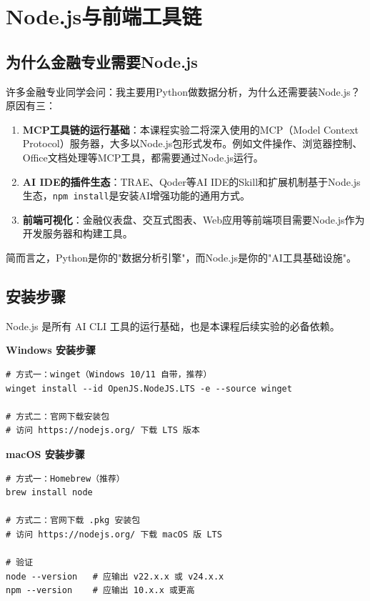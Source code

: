 \section{Node.js与前端工具链}

\subsection{为什么金融专业需要Node.js}

许多金融专业同学会问：我主要用Python做数据分析，为什么还需要装Node.js？原因有三：

\begin{enumerate}[leftmargin=2em]
  \item \textbf{MCP工具链的运行基础}：本课程实验二将深入使用的MCP（Model Context Protocol）服务器，大多以Node.js包形式发布。例如文件操作、浏览器控制、Office文档处理等MCP工具，都需要通过Node.js运行。
  \item \textbf{AI IDE的插件生态}：TRAE、Qoder等AI IDE的Skill和扩展机制基于Node.js生态，\texttt{npm install}是安装AI增强功能的通用方式。
  \item \textbf{前端可视化}：金融仪表盘、交互式图表、Web应用等前端项目需要Node.js作为开发服务器和构建工具。
\end{enumerate}

简而言之，Python是你的"数据分析引擎"，而Node.js是你的"AI工具基础设施"。

\subsection{安装步骤}

Node.js 是所有 AI CLI 工具的运行基础，也是本课程后续实验的必备依赖。

\textbf{Windows 安装步骤}

\begin{lstlisting}[style=shell]
# 方式一：winget（Windows 10/11 自带，推荐）
winget install --id OpenJS.NodeJS.LTS -e --source winget

# 方式二：官网下载安装包
# 访问 https://nodejs.org/ 下载 LTS 版本
\end{lstlisting}

\textbf{macOS 安装步骤}

\begin{lstlisting}[style=shell]
# 方式一：Homebrew（推荐）
brew install node

# 方式二：官网下载 .pkg 安装包
# 访问 https://nodejs.org/ 下载 macOS 版 LTS

# 验证
node --version   # 应输出 v22.x.x 或 v24.x.x
npm --version    # 应输出 10.x.x 或更高
\end{lstlisting}

